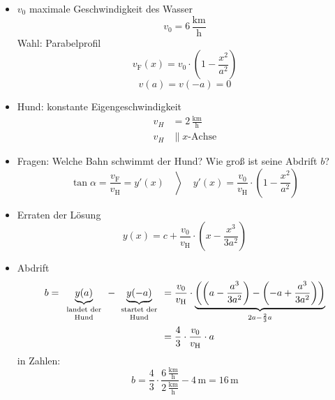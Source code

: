 \begin{example}\flush
  \begingroup
  \newcommand{\kmh}{\ensuremath{\,\textstyle \frac{\text{km}}{\text{h}}}}
  \begin{itemize}
    \item $v_0$ maximale Geschwindigkeit des Wasser
      \begin{equation*} v_0 = 6 \kmh \end{equation*}
      Wahl: Parabelprofil
      \begin{equation*} v_\text{F}(x) = v_0 \cdot \left( 1 - \frac{x^2}{a^2} \right) \end{equation*}
      \begin{equation*} v(a) = v(-a) = 0 \end{equation*}
    \item Hund: konstante Eigengeschwindigkeit
      \begin{align*}
        v_H &= 2 \kmh \\
        v_H &\parallel \text{$x$-Achse}
      \end{align*}
  \end{itemize}
  \par
  \begin{itemize} %
    \item Fragen: Welche Bahn schwimmt der Hund? Wie groß ist seine Abdrift $b$?
      \begin{equation*} \left. \tan \alpha = \frac{v_\text{F}}{v_\text{H}} = y'(x) \quad\right\rangle\quad y'(x) = \frac{v_0}{v_\text{H}} \cdot \left( 1 - \frac{x^2}{a^2}\right)\end{equation*}
    \item Erraten der Lösung
      \begin{equation*}
      y(x) = c + \frac{v_0}{v_\text{H}} \cdot \left( x - \frac{x^3}{3a^2}\right)
      \end{equation*}
    \item Abdrift
      \begin{align*}
        b = \underbrace{y(a)}_{\parbox{16mm}{\centering\scriptsize landet der Hund}} -\underbrace{y(-a)}_{\parbox{16mm}{\centering\scriptsize startet der Hund}} &= \ds\frac{v_0}{v_\text{H}} \cdot \underbrace{\left( \left( a - \frac{a^3}{3a^2}\right) - \left( -a + \frac{a^3}{3a^2}\right) \right)}_{2a - \frac 2 3 a} \\
        &= \ds\frac 4 3 \cdot \frac{v_0}{v_\text{H}}\cdot  a
      \end{align*}
      in Zahlen:
      \begin{equation*}
        b = \frac 4 3 \cdot \frac {6 \kmh}{2 \kmh} - 4 \,\text{m} = 16 \,\text{m}
      \end{equation*}
  \end{itemize}
  \endgroup
\end{example}

